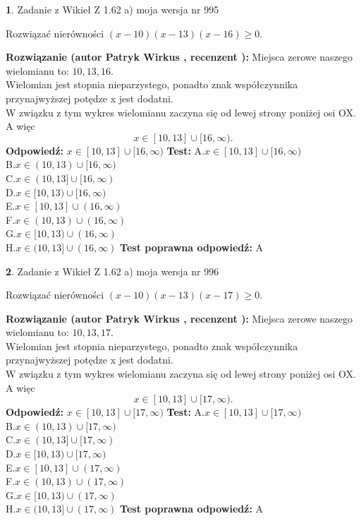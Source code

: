 \documentclass[12pt, a4paper]{article}
\theoremstyle{definition} %
\newtheorem{zad}{}
\newcommand{\zadStart}[1]{\begin{zad}#1\newline}
\newcommand{\zadStop}{\end{zad}}
\newcommand{\rozwStart}[2]{\noindent \textbf{Rozwiązanie (autor #1 , recenzent #2): }\newline}
\newcommand{\rozwStop}{\newline}
\newcommand{\odpStart}{\noindent \textbf{Odpowiedź:}\newline}
\newcommand{\odpStop}{\newline}
\newcommand{\testStart}{\noindent \textbf{Test:}\newline}
\newcommand{\testStop}{\newline}
\newcommand{\kluczStart}{\noindent \textbf{Test poprawna odpowiedź:}\newline}
\newcommand{\kluczStop}{\newline}
\begin{document}
\zadStart{Zadanie z Wikieł Z 1.62 a) moja wersja nr 995}

Rozwiązać nierówności $(x-10)(x-13)(x-16)\ge0$.
\zadStop
\rozwStart{Patryk Wirkus}{}
Miejsca zerowe naszego wielomianu to: $10, 13, 16$.\\
Wielomian jest stopnia nieparzystego, ponadto znak współczynnika przy\linebreak najwyższej potędze x jest dodatni.\\ W związku z tym wykres wielomianu zaczyna się od lewej strony poniżej osi OX. A więc $$x \in [10,13] \cup [16,\infty).$$
\rozwStop
\odpStart
$x \in [10,13] \cup [16,\infty)$
\odpStop
\testStart
A.$x \in [10,13] \cup [16,\infty)$\\
B.$x \in (10,13) \cup [16,\infty)$\\
C.$x \in (10,13] \cup [16,\infty)$\\
D.$x \in [10,13) \cup [16,\infty)$\\
E.$x \in [10,13] \cup (16,\infty)$\\
F.$x \in (10,13) \cup (16,\infty)$\\
G.$x \in [10,13) \cup (16,\infty)$\\
H.$x \in (10,13] \cup (16,\infty)$
\testStop
\kluczStart
A
\kluczStop



\zadStart{Zadanie z Wikieł Z 1.62 a) moja wersja nr 996}

Rozwiązać nierówności $(x-10)(x-13)(x-17)\ge0$.
\zadStop
\rozwStart{Patryk Wirkus}{}
Miejsca zerowe naszego wielomianu to: $10, 13, 17$.\\
Wielomian jest stopnia nieparzystego, ponadto znak współczynnika przy\linebreak najwyższej potędze x jest dodatni.\\ W związku z tym wykres wielomianu zaczyna się od lewej strony poniżej osi OX. A więc $$x \in [10,13] \cup [17,\infty).$$
\rozwStop
\odpStart
$x \in [10,13] \cup [17,\infty)$
\odpStop
\testStart
A.$x \in [10,13] \cup [17,\infty)$\\
B.$x \in (10,13) \cup [17,\infty)$\\
C.$x \in (10,13] \cup [17,\infty)$\\
D.$x \in [10,13) \cup [17,\infty)$\\
E.$x \in [10,13] \cup (17,\infty)$\\
F.$x \in (10,13) \cup (17,\infty)$\\
G.$x \in [10,13) \cup (17,\infty)$\\
H.$x \in (10,13] \cup (17,\infty)$
\testStop
\kluczStart
A
\kluczStop
\end{document}
